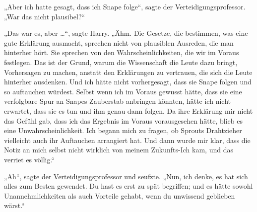„Aber ich hatte gesagt, dass ich Snape folge“, sagte der Verteidigungsprofessor.
„War das nicht plausibel?“

„Das war es, aber …“, sagte Harry. „Ähm. Die Gesetze, die bestimmen, was eine gute Erklärung ausmacht, sprechen nicht von plausiblen Ausreden, die man hinterher hört. Sie sprechen von den Wahrscheinlichkeiten, die wir im Voraus festlegen. Das ist der Grund, warum die Wissenschaft die Leute dazu bringt, Vorhersagen zu machen, anstatt den Erklärungen zu vertrauen, die sich die Leute hinterher ausdenken. Und ich hätte nicht vorhergesagt, dass sie Snape folgen und so auftauchen würdest. Selbst wenn ich im Voraus gewusst hätte, dass sie eine verfolgbare Spur an Snapes Zauberstab anbringen könnten, hätte ich nicht erwartet, dass sie es tun und ihm genau dann folgen. Da ihre Erklärung mir nicht das Gefühl gab, dass ich das Ergebnis im Voraus vorausgesehen hätte, blieb es eine Unwahrscheinlichkeit. Ich begann mich zu fragen, ob Sprouts Drahtzieher vielleicht auch ihr Auftauchen arrangiert hat. Und dann wurde mir klar, dass die Notiz an mich selbst nicht wirklich von meinem Zukunfts-Ich kam, und das verriet es völlig.“

„Ah“, sagte der Verteidigungsprofessor und seufzte.
„Nun, ich denke, es hat sich alles zum Besten gewendet. Du hast es erst zu spät begriffen; und es hätte sowohl Unannehmlichkeiten als auch Vorteile gehabt, wenn du unwissend geblieben wärst.“

